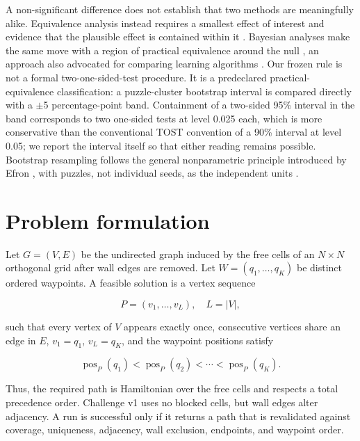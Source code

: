 \documentclass[pdflatex,sn-basic,iicol]{sn-jnl}
\begin{document}
A non-significant difference does not establish that two methods are meaningfully alike. Equivalence analysis instead requires a smallest effect of interest and evidence that the plausible effect is contained within it \citep{lakens2017equivalence}. Bayesian analyses make the same move with a region of practical equivalence around the null \citep{kruschke2018rope}, an approach also advocated for comparing learning algorithms \citep{benavoli2017timeforchange}. Our frozen rule is not a formal two-one-sided-test procedure. It is a predeclared practical-equivalence classification: a puzzle-cluster bootstrap interval is compared directly with a \(\pm\)5 percentage-point band. Containment of a two-sided 95\% interval in the band corresponds to two one-sided tests at level 0.025 each, which is more conservative than the conventional TOST convention of a 90\% interval at level 0.05; we report the interval itself so that either reading remains possible. Bootstrap resampling follows the general nonparametric principle introduced by Efron \citep{efron1979bootstrap}, with puzzles, not individual seeds, as the independent units \citep{field2007clustered}.

\section{Problem formulation}

Let $G = (V, E)$ be the undirected graph induced by the free cells of an $N\times N$ orthogonal grid after wall edges are removed. Let $W=(q_1,\ldots,q_K)$ be distinct ordered waypoints. A feasible solution is a vertex sequence

\begin{equation}
P=(v_1,\ldots,v_L),\quad L=|V|,
\end{equation}

such that every vertex of $V$ appears exactly once, consecutive vertices share an edge in $E$, $v_1=q_1$, $v_L=q_K$, and the waypoint positions satisfy

\begin{equation}
\operatorname{pos}_P(q_1)<\operatorname{pos}_P(q_2)<\cdots<\operatorname{pos}_P(q_K).
\end{equation}

Thus, the required path is Hamiltonian over the free cells and respects a total precedence order. Challenge v1 uses no blocked cells, but wall edges alter adjacency. A run is successful only if it returns a path that is revalidated against coverage, uniqueness, adjacency, wall exclusion, endpoints, and waypoint order.
\end{document}
